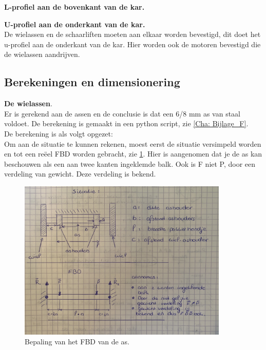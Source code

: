 \vspace{1mm}
\textbf{L-profiel aan de bovenkant van de kar.}

\vspace{1mm}
\textbf{U-profiel aan de onderkant van de kar.}\\
De wielassen en de schaarliften moeten aan elkaar worden bevestigd, dit doet het u-profiel aan de onderkant van de kar. Hier worden ook de motoren bevestigd die de wielassen aandrijven.\\

\vspace{1mm}
\subsection{Berekeningen en dimensionering}
\label{se:berekening_en_dimensionering}
\vspace{\baselineskip}

\textbf{De wielassen}.\\
Er is gerekend aan de assen en de conclusie is dat een 6/8 mm as van staal voldoet. De berekening is gemaakt in een python script, zie \cref{Cha: Bijlage_F}.\\
\vspace{\baselineskip}
De berekening is als volgt opgezet:\\
Om aan de situatie te kunnen rekenen, moest eerst de situatie versimpeld worden en tot een reëel FBD worden gebracht, zie \cref{fig: as_FBD}. Hier is aangenomen dat je de as kan beschouwen als een aan twee kanten ingeklemde balk. Ook is F niet P, door een verdeling van gewicht. Deze verdeling is bekend.

\begin{figure}[H]
    \includegraphics[width = 100mm]{04_conceptdimensionering/As_FBD.jpg}
    \caption{Bepaling van het FBD van de as.}
    \label{fig: as_FBD}
\end{figure}

